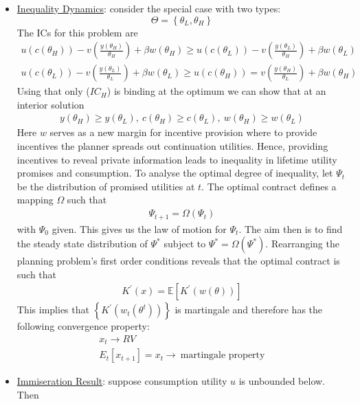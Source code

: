 \documentclass{article}
\begin{document}
\begin{itemize}
    \item  \underline{Inequality Dynamics}: consider the special case with two types: $$\Theta = \left\{ \theta_{L}, \theta_{H} \right\}$$ The ICs for this problem are
    \begin{gather*}
        u(c(\theta_{H})) - v(\frac{y(\theta_{H})}{\theta_{H}}) + \beta w(\theta_{H}) \geq u(c(\theta_{L})) - v(\frac{y(\theta_{L})}{\theta_{H}}) + \beta w(\theta_{L}) \\
        u(c(\theta_{L})) - v(\frac{y(\theta_{L})}{\theta_{L}}) + \beta w(\theta_{L}) \geq u(c(\theta_{H})) = v(\frac{y(\theta_{H})}{\theta_{L}}) + \beta w(\theta_{H})
    \end{gather*}
    Using that only ($IC_{H}$) is binding at the optimum we can show that at an interior solution
    \begin{gather*}
        y(\theta_{H}) \geq y(\theta_{L}), \ c(\theta_{H}) \geq c(\theta_{L}), \ w(\theta_{H}) \geq w(\theta_{L})
    \end{gather*}
    Here $w$ serves as a new margin for incentive provision where to provide incentives the planner spreads out continuation utilities. Hence, providing incentives to reveal private information leads to inequality in lifetime utility promises and consumption. To analyse the optimal degree of inequality, let $\Psi_{t}$ be the distribution of promised utilities at $t$. The optimal contract defines a mapping $\Omega$ such that
    \begin{gather*}
        \Psi_{t+1} = \Omega (\Psi_{t})
    \end{gather*}
    with $\Psi_{0}$ given. This gives us the law of motion for $\Psi_{t}$. The aim then is to find the steady state distribution of $\Psi^{*}$ subject to $\Psi^{*} = \Omega (\Psi^{*})$. Rearranging the planning problem's first order conditions reveals that the optimal contract is such that
    \begin{gather*}
        K^{'}(x) = \mathbb{E} [K^{'} (w(\theta))]
    \end{gather*}
    This implies that $\left\{ K^{'}(w_{t}(\theta^{t})) \right\}$ is martingale and therefore has the following convergence property:
    \begin{gather*}
        x_{t} \rightarrow RV \\
        E_{t}[x_{t+1}] = x_{t} \rightarrow \ \text{martingale property}
    \end{gather*}
    \item  \underline{Immiseration Result}: suppose consumption utility $u$ is unbounded below. Then

\end{itemize}
\end{document}
